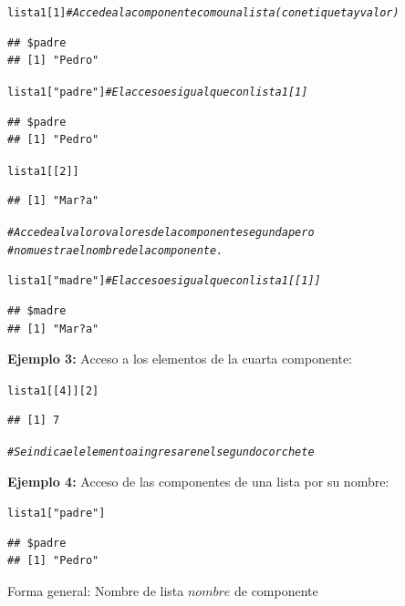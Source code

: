 \documentclass[12pt,letterpaper]{article}\usepackage[]{graphicx}\usepackage[]{color}
\makeatletter
\newcommand{\hlnum}[1]{\textcolor[rgb]{0.686,0.059,0.569}{#1}}%
\newcommand{\hlstr}[1]{\textcolor[rgb]{0.192,0.494,0.8}{#1}}%
\newcommand{\hlcom}[1]{\textcolor[rgb]{0.678,0.584,0.686}{\textit{#1}}}%
\newcommand{\hlstd}[1]{\textcolor[rgb]{0.345,0.345,0.345}{#1}}%
\newenvironment{kframe}{%
 \def\at@end@of@kframe{}%
 \ifinner\ifhmode%
  \def\at@end@of@kframe{\end{minipage}}%
  \begin{minipage}{\columnwidth}%
 \fi\fi%
 \def\FrameCommand##1{\hskip\@totalleftmargin \hskip-\fboxsep
 \colorbox{shadecolor}{##1}\hskip-\fboxsep
     \hskip-\linewidth \hskip-\@totalleftmargin \hskip\columnwidth}%
 \MakeFramed {\advance\hsize-\width
   \@totalleftmargin\z@ \linewidth\hsize
   \@setminipage}}%
 {\par\unskip\endMakeFramed%
 \at@end@of@kframe}
\newenvironment{knitrout}{}{} %
\makeatother
\begin{document}
\begin{knitrout}
\color{fgcolor}\begin{kframe}
\begin{alltt}
\hlstd{lista1[}\hlnum{1}\hlstd{]} \hlcom{# Accede a la componente como una lista (con etiqueta y valor)}
\end{alltt}
\begin{verbatim}
## $padre
## [1] "Pedro"
\end{verbatim}
\begin{alltt}
\hlstd{lista1[}\hlstr{"padre"}\hlstd{]} \hlcom{# El acceso es igual que con lista1[1]}
\end{alltt}
\begin{verbatim}
## $padre
## [1] "Pedro"
\end{verbatim}
\begin{alltt}
\hlstd{lista1[[}\hlnum{2}\hlstd{]]}
\end{alltt}
\begin{verbatim}
## [1] "Mar?a"
\end{verbatim}
\begin{alltt}
\hlcom{# Accede al valor o valores de la componente segunda pero }
\hlcom{# no muestra el nombre de la componente.}


\hlstd{lista1[}\hlstr{"madre"}\hlstd{]} \hlcom{# El acceso es igual que con lista1[[1]]}
\end{alltt}
\begin{verbatim}
## $madre
## [1] "Mar?a"
\end{verbatim}
\end{kframe}
\end{knitrout}
\textbf{Ejemplo 3:} Acceso a los elementos de la cuarta componente:
\begin{knitrout}
\color{fgcolor}\begin{kframe}
\begin{alltt}
\hlstd{lista1[[}\hlnum{4}\hlstd{]][}\hlnum{2}\hlstd{]}
\end{alltt}
\begin{verbatim}
## [1] 7
\end{verbatim}
\begin{alltt}
\hlcom{# Se indica el elemento a ingresar en el segundo corchete}
\end{alltt}
\end{kframe}
\end{knitrout}
\textbf{Ejemplo 4:} Acceso de las componentes de una lista por su nombre:
\begin{knitrout}
\color{fgcolor}\begin{kframe}
\begin{alltt}
\hlstd{lista1[}\hlstr{"padre"}\hlstd{]}
\end{alltt}
\begin{verbatim}
## $padre
## [1] "Pedro"
\end{verbatim}
\end{kframe}
\end{knitrout}
Forma general: Nombre de lista $nombre$ de componente \\
\end{document}
